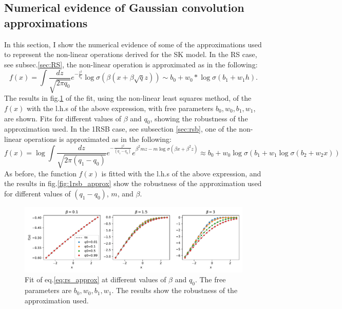\documentclass[10pt, notitlepage]{revtex4-2}
\begin{document}
\subsection{Numerical evidence of Gaussian convolution approximations}
\label{sec:num_evidence}
In this section, I show the numerical evidence of some of the approximations used to represent the non-linear operations derived for the SK model. In the RS case, see subsec.\ref{sec:RS}, the non-linear operation is approximated as in the following:
\begin{equation}
    \label{eq:rs_approx}
    f(x) = \int \frac{dz}{\sqrt{2 \pi q_0}} e^{-\frac{z^2}{q_0}}
\log \sigma \left(\beta \left(
x +\beta \sqrt{q}z \right)\right) \sim b_0 + w_0*\log \sigma(b_1 + w_1 h). 
\end{equation}
The results in fig.\ref{fig:rs_approx} of the fit, using the non-linear least squares method, of the $f(x)$ with the l.h.s of the above expression, with free parameters $b_0, w_0, b_1, w_1$, are shown. Fits for different values of $\beta$ and $q_0$, showing the robustness of the approximation used.  In the 1RSB case, see subsection \ref{sec:rsb}, one of the non-linear operations is approximated as in the following:
\begin{equation}
    f(x) = \log \int  \frac{dz}{\sqrt{2 \pi (q_1-q_0)}} e^{-\frac{z^2}{(q_1-q_0)}} e^{ \beta^2 m z - m \log \sigma \left(\beta x+\beta^2 z \right) }  \approx b_0  + w_0  \log\sigma(b_1  + w_1  \log \sigma (b_2  + w_2  x))
    \label{eq:1rsb_approx}
\end{equation}
As before, the function $f(x)$ is fitted with the l.h.s of the above expression, and the results in fig.\ref{fig:1rsb_approx} show the robustness of the approximation used for different values of $(q_1-q_0)$, $m$, and $\beta$.
\begin{figure}[h]
    \centering
    \includegraphics[width=1\textwidth]{img/fit_rs.pdf}
    \caption{Fit of eq.\ref{eq:rs_approx} at different values of $\beta$ and $q_0$. The free parameters are $b_0, w_0, b_1, w_1$. The results show the robustness of the approximation used. }
    \label{fig:rs_approx}
\end{figure}
\end{document}
